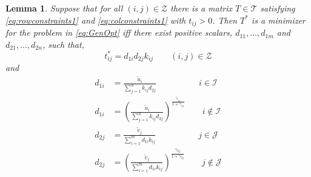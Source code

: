 \documentclass[twocolumn]{article}
\newtheorem{lemma}{Lemma}
\begin{document}
\begin{lemma}
\label{lem:lem2b}
Suppose that for all $(i,j) \in {\mathcal Z}$ there is a matrix $T\in {\mathcal T}$ satisfying \eqref{eq:rowconstraints1} and  \eqref{eq:colconstraints1} with $t_{ij} >0$.
Then $T^*$ is a minimizer for the problem in  \eqref{eq:GenOpt}   iff
there exist    positive scalars, $d_{11}, \dots,  d_{1m}$ and $d_{21},\dots, d_{2n}$,  such that, 
\begin{equation}
t^*_{ij} = d_{1i} d_{2j}k_{ij}   \qquad (i, j)
\in  \mathcal{Z}
\label{eq:TKscale2}
\end{equation}
and
\begin{align}
 d_{1i} &=\frac{ \tilde{u}_i} {\sum_{j=1}^n  k_{ij} d_{2j}}	\qquad \qquad \quad i\in {\mathcal I}
 \label{eq:d1i}\\
  d_{1i} &= \left( \frac{ \tilde{u}_i} {\sum_{j=1}^n  k_{ij} d_{2j}}\right)^{\frac{\gamma_{1i}}{1+\gamma_{1i}}}
  \qquad i \notin {\mathcal I}
  \label{eq:d1i2}\\
  d_{2j} &= \frac{ \tilde{v}_j}{\sum_{i=1}^m  d_{1i} k_{ij}}	
  \qquad \qquad \quad j\in {\mathcal J}	 \label{eq:d2j}\\
d_{2j} &= \left(\frac{ \tilde{v}_j}{\sum_{i=1}^m  d_{1i} k_{ij}}\right)^{\frac{\gamma_{2j}}{1+\gamma_{2j}}}
  \qquad j \notin {\mathcal J}
    \label{eq:d2j2}
\end{align}

\end{lemma}
\end{document}
